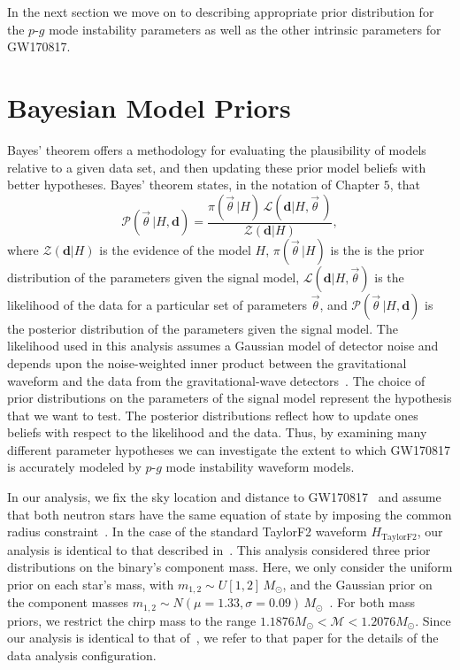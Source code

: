 In the next section we move on to describing appropriate prior distribution for the $p$-$g$ mode instability parameters as well as the other intrinsic parameters for GW170817.

\section{Bayesian Model Priors} \label{sec:priors}
Bayes' theorem offers a methodology for evaluating the plausibility of models relative to a given data set, and then updating these prior model beliefs with better hypotheses. Bayes' theorem states, in the notation of Chapter $5$, that
\begin{equation}
\mathcal{P}\left(\vec{\theta}\,| H, \mathbf{d}\right) = \frac{\pi\left(\vec{\theta}\,|H\right) \, \mathcal{L}\left(\mathbf{d}|H, \vec{\theta}\,\right)}{\mathcal{Z}\left(\mathbf{d}|H\right)},
\label{eq:bayestheorem}
\end{equation}
where $\mathcal{Z} \left(\mathbf{d}|H \right)$ is the evidence of the model $H$, $\pi \left(\vec{\theta}\,|H\right)$ is the is the prior distribution of the parameters given the signal model, $\mathcal{L}\left(\mathbf{d}|H, \vec{\theta}\right)$ is the likelihood of the data for a particular set of parameters $\vec{\theta}$, and $\mathcal{P}\left( \vec{\theta}\,|H, \mathbf{d}\right)$ is the posterior distribution of the parameters given the signal model. The likelihood used in this analysis assumes a Gaussian model of detector noise and depends upon the noise-weighted inner product between the gravitational waveform and the data from the gravitational-wave detectors~\citep{Finn:2000hj,Rover:2006bb}. The choice of prior distributions on the parameters of the signal model represent the hypothesis that we want to test. The posterior distributions reflect how to update ones beliefs with respect to the likelihood and the data. Thus, by examining many different parameter hypotheses we can investigate the extent to which GW170817 is accurately modeled by $p$-$g$ mode instability waveform models.

In our analysis, we fix the sky location and distance to GW170817~\citep{Soares-Santos:2017lru,Cantiello:2018ffy} and assume that both neutron stars have the same equation of state by imposing the common radius constraint~\citep{de2018tidal}. In the case of the standard TaylorF2 waveform $H_\mathrm{TaylorF2}$, our analysis is identical to that described in~\cite{de2018tidal}. This analysis considered three prior distributions on the binary's component mass. Here, we only consider the uniform prior on each star's mass, with $m_{1,2} \sim U[1,2]\, M_\odot$, and the Gaussian prior on the component masses $m_{1,2} \sim N(\mu = 1.33, \sigma = 0.09)\, M_\odot$~\citep{Ozel:2016oaf}. For both mass priors, we restrict the chirp mass to the range $ 1.1876 M_\odot < \mathcal{M} < 1.2076 M_\odot$. Since our analysis is identical to that of~\citep{de2018tidal}, we refer to that paper for the details of the data analysis configuration.

